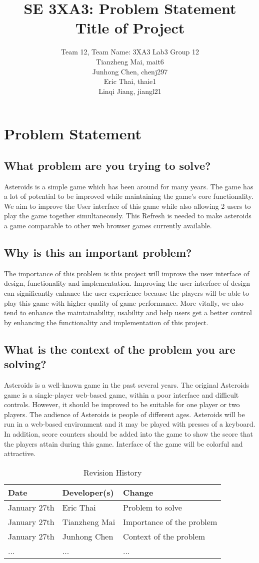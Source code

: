 \documentclass{article}
\title{SE 3XA3: Problem Statement\\Title of Project}
\author{Team 12, Team Name: 3XA3 Lab3 Group 12
		\\Tianzheng Mai, mait6
       \\Junhong Chen, chenj297 
		\\Eric Thai, thaie1
		\\Linqi Jiang, jiangl21
}
\date{}
\begin{document}
\maketitle

\section{Problem Statement}

\subsection{What problem are you trying to solve?}
Asteroids is a simple game which has been around for many years. The game has a lot of potential to be improved while maintaining the game’s core functionality. We aim to improve the User interface of this game while also allowing 2 users to play the game together simultaneously. This Refresh is needed to make asteroids a game comparable to other web browser games currently available.
\subsection{Why is this an important problem?}
The importance of this problem is this project will improve the user interface of design, functionality and implementation. Improving the user interface of design can significantly enhance the user experience because the players will be able to play this game with higher quality of game performance. More vitally, we also tend to enhance the maintainability, usability and help users get a better control by enhancing the functionality and implementation of this project. 
\subsection{What is the context of the problem you are solving?}
Asteroids is a well-known game in the past several years. The original Asteroids game is a single-player web-based game, within a poor interface and difficult controls. However, it should be improved to be suitable for one player or two players. The audience of Asteroids is people of different ages. Asteroids will be run in a web-based environment and it may be played with presses of a keyboard. In addition, score counters should be added into the game to show the score that the players attain during this game. Interface of the game will be colorful and attractive. 

\begin{table}[hp]
\caption{Revision History} \label{TblRevisionHistory}
\begin{tabularx}{\textwidth}{llX}
\toprule
\textbf{Date} & \textbf{Developer(s)} & \textbf{Change}\\
\midrule
January 27th & Eric Thai & Problem to solve\\
January 27th & Tianzheng Mai & Importance of the problem\\
January 27th & Junhong Chen & Context of the problem\\
... & ... & ...\\
\bottomrule
\end{tabularx}
\end{table}
\end{document}
